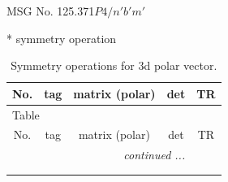 \documentclass[fleqn,8pt]{jsarticle}
\begin{document}
\setcounter{MaxMatrixCols}{32}

\renewcommand{\tablename}{Table~}
\renewcommand{\figurename}{Figure~}
\begin{center}
\LARGE
MSG No. 125.371\quad$P4/n'b'm'$
\end{center}
* symmetry operation
\renewcommand{\arraystretch}{1.3}
\begin{longtable}{ccccc}
\caption{Symmetry operations for 3d polar vector.}
 \\
 \hline \hline
No. & tag & matrix (polar) & det & TR \\ \hline \endfirsthead

\multicolumn{4}{l}{\tablename\ \thetable{}} \\
 \hline \hline
No. & tag & matrix (polar) & det & TR \\ \hline \endhead

 \hline \hline
\multicolumn{4}{r}{\footnotesize\it continued ...} \\ \endfoot

 \hline \hline
\multicolumn{4}{r}{} \\ \endlastfoot


\end{longtable}
\end{document}
